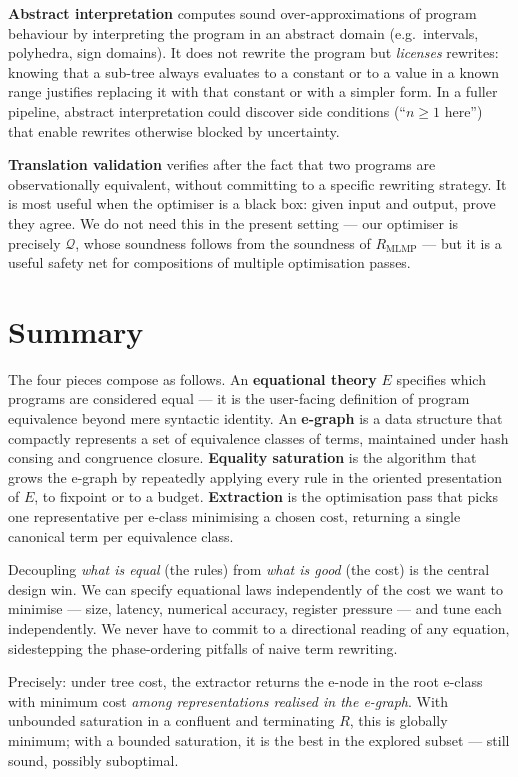 \documentclass[11pt,a4paper]{article}
\begin{document}
\textbf{Abstract interpretation} \citep{cousot1977abstract} computes sound over-approximations of program behaviour by interpreting the program in an abstract domain (e.g.\ intervals, polyhedra, sign domains). It does not rewrite the program but \emph{licenses} rewrites: knowing that a sub-tree always evaluates to a constant or to a value in a known range justifies replacing it with that constant or with a simpler form. In a fuller pipeline, abstract interpretation could discover side conditions (``$n \ge 1$ here'') that enable rewrites otherwise blocked by uncertainty.

\textbf{Translation validation} verifies after the fact that two programs are observationally equivalent, without committing to a specific rewriting strategy. It is most useful when the optimiser is a black box: given input and output, prove they agree. We do not need this in the present setting --- our optimiser is precisely $\mathcal{Q}$, whose soundness follows from the soundness of $R_{\text{MLMP}}$ --- but it is a useful safety net for compositions of multiple optimisation passes.

\section{Summary}\label{sec:summary}

The four pieces compose as follows. An \textbf{equational theory} $E$ specifies which programs are considered equal --- it is the user-facing definition of program equivalence beyond mere syntactic identity. An \textbf{e-graph} is a data structure that compactly represents a set of equivalence classes of terms, maintained under hash consing and congruence closure. \textbf{Equality saturation} is the algorithm that grows the e-graph by repeatedly applying every rule in the oriented presentation of $E$, to fixpoint or to a budget. \textbf{Extraction} is the optimisation pass that picks one representative per e-class minimising a chosen cost, returning a single canonical term per equivalence class.

Decoupling \emph{what is equal} (the rules) from \emph{what is good} (the cost) is the central design win. We can specify equational laws independently of the cost we want to minimise --- size, latency, numerical accuracy, register pressure --- and tune each independently. We never have to commit to a directional reading of any equation, sidestepping the phase-ordering pitfalls of naive term rewriting.

Precisely: under tree cost, the extractor returns the e-node in the root e-class with minimum cost \emph{among representations realised in the e-graph}. With unbounded saturation in a confluent and terminating $R$, this is globally minimum; with a bounded saturation, it is the best in the explored subset --- still sound, possibly suboptimal.
\end{document}
